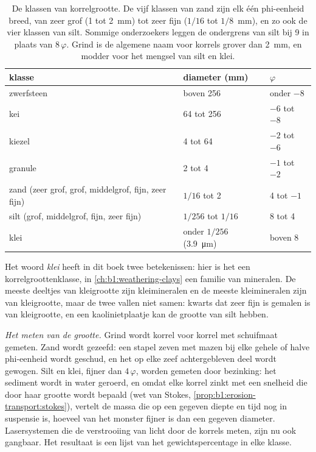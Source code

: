 \begin{table}[htbp]
\centering\small
\begin{tabular}{@{}lll@{}}
\hline
klasse & diameter (\si{mm}) & $\varphi$ \\
\hline
zwerfsteen & boven 256 & onder $-8$ \\
kei & 64 tot 256 & $-6$ tot $-8$ \\
kiezel & 4 tot 64 & $-2$ tot $-6$ \\
granule & 2 tot 4 & $-1$ tot $-2$ \\
zand (zeer grof, grof, middelgrof, fijn, zeer fijn) & $1/16$ tot 2 & 4 tot $-1$ \\
silt (grof, middelgrof, fijn, zeer fijn) & $1/256$ tot $1/16$ & 8 tot 4 \\
klei & onder $1/256$ (\qty{3.9}{\micro m}) & boven 8 \\
\hline
\end{tabular}
\caption{De klassen van korrelgrootte. De vijf klassen van zand zijn elk één phi-eenheid breed, van zeer grof (1 tot \qty{2}{mm}) tot zeer fijn ($1/16$ tot $1/8$~mm), en zo ook de vier klassen van silt. Sommige onderzoekers leggen de ondergrens van silt bij 9 in plaats van $8\,\varphi$. Grind is de algemene naam voor korrels grover dan \qty{2}{mm}, en modder voor het mengsel van silt en klei.}
\label{tab:b1:clastic-sediments:classes}
\end{table}

Het woord \emph{klei} heeft in dit boek twee betekenissen: hier is het een korrelgroottenklasse, in \cref{ch:b1:weathering-clays} een familie van mineralen. De meeste deeltjes van kleigrootte zijn kleimineralen en de meeste kleimineralen zijn van kleigrootte, maar de twee vallen niet samen: kwarts dat zeer fijn is gemalen is van kleigrootte, en een kaolinietplaatje kan de grootte van silt hebben.

\emph{Het meten van de grootte.} Grind wordt korrel voor korrel met schuifmaat gemeten. Zand wordt gezeefd: een stapel zeven met mazen bij elke gehele of halve phi-eenheid wordt geschud, en het op elke zeef achtergebleven deel wordt gewogen. Silt en klei, fijner dan $4\,\varphi$, worden gemeten door bezinking: het sediment wordt in water geroerd, en omdat elke korrel zinkt met een snelheid die door haar grootte wordt bepaald (wet van Stokes, \cref{prop:b1:erosion-transport:stokes}), vertelt de massa die op een gegeven diepte en tijd nog in suspensie is, hoeveel van het monster fijner is dan een gegeven diameter. Lasersystemen die de verstrooiing van licht door de korrels meten, zijn nu ook gangbaar. Het resultaat is een lijst van het gewichtspercentage in elke klasse.

